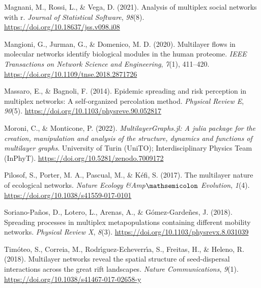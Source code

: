 \documentclass[
]{article}
\newlength{\cslhangindent}
\newlength{\cslentryspacingunit} %
\newenvironment{CSLReferences}[2] %
 {%
  \setlength{\parindent}{0pt}
  \ifodd #1
  \let\oldpar\par
  \def\par{\hangindent=\cslhangindent\oldpar}
  \fi
  \setlength{\parskip}{#2\cslentryspacingunit}
 }%
 {}
\begin{document}
\begin{CSLReferences}{1}{0}
\leavevmode{}%
Magnani, M., Rossi, L., \& Vega, D. (2021). Analysis of multiplex social
networks with r. \emph{Journal of Statistical Software}, \emph{98}(8).
\url{https://doi.org/10.18637/jss.v098.i08}

\leavevmode{}%
Mangioni, G., Jurman, G., \& Domenico, M. D. (2020). Multilayer flows in
molecular networks identify biological modules in the human proteome.
\emph{{IEEE} Transactions on Network Science and Engineering},
\emph{7}(1), 411--420. \url{https://doi.org/10.1109/tnse.2018.2871726}

\leavevmode{}%
Massaro, E., \& Bagnoli, F. (2014). Epidemic spreading and risk
perception in multiplex networks: A self-organized percolation method.
\emph{Physical Review E}, \emph{90}(5).
\url{https://doi.org/10.1103/physreve.90.052817}

\leavevmode{}%
Moroni, C., \& Monticone, P. (2022). \emph{MultilayerGraphs.jl: A julia
package for the creation, manipulation and analysis of the structure,
dynamics and functions of multilayer graphs}. University of Turin
(UniTO); Interdisciplinary Physics Team (InPhyT).
\url{https://doi.org/10.5281/zenodo.7009172}

\leavevmode{}%
Pilosof, S., Porter, M. A., Pascual, M., \& Kéfi, S. (2017). The
multilayer nature of ecological networks. \emph{Nature Ecology
{\&}Amp\(\mathsemicolon\) Evolution}, \emph{1}(4).
\url{https://doi.org/10.1038/s41559-017-0101}

\leavevmode{}%
Soriano-Paños, D., Lotero, L., Arenas, A., \& Gómez-Gardeñes, J. (2018).
Spreading processes in multiplex metapopulations containing different
mobility networks. \emph{Physical Review X}, \emph{8}(3).
\url{https://doi.org/10.1103/physrevx.8.031039}

\leavevmode{}%
Timóteo, S., Correia, M., Rodrı́guez-Echeverrı́a, S., Freitas, H., \&
Heleno, R. (2018). Multilayer networks reveal the spatial structure of
seed-dispersal interactions across the great rift landscapes.
\emph{Nature Communications}, \emph{9}(1).
\url{https://doi.org/10.1038/s41467-017-02658-y}

\end{CSLReferences}
\end{document}

